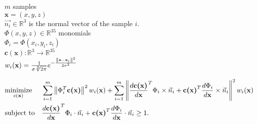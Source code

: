 $m$ samples\\
$\textbf{x}=(x,y,z)$\\
$\vec{n_i} \in \mathbb{R}^3 $ is the normal vector of the sample $i$.\\
$\Phi(x,y,z) \in \mathbb{R}^{35}$ monomials\\
$\Phi_i = \Phi(x_i,y_i,z_i)$\\
$\textbf{c}(\textbf{x}): \mathbb{R}^3 \rightarrow \mathbb{R}^{35}$\\
$w_{i}(\textbf{x}) =
\frac{1}{\sigma\sqrt[2]{2\pi}}e^{-\frac{\left\lVert\textbf{x}-\textbf{x}_i\right\rVert^2}{2\sigma^2}}$

\begin{equation*}
\begin{aligned}
& \underset{c(\textbf{x})}{\text{minimize}}
& &  \sum^m_{i=1}
\left\lVert \Phi_i^T\textbf{c(x)}\right\rVert^2w_{i}(\textbf{x})+\sum^m_{i=1}
\left\lVert\frac{d\textbf{c(x)}}{d\textbf{x}}^T\Phi_i\times
\vec{n}_i+\textbf{c(x)}^T\frac{d\Phi_i}{d\textbf{x}}\times
\vec{n}_i\right\rVert^2w_{i}(\textbf{x})\\
& \text{subject to}
& & \frac{d\textbf{c(x)}}{d\textbf{x}}^T\Phi_i\cdot
\vec{n}_i+\textbf{c(x)}^T\frac{d\Phi_i}{d\textbf{x}}\cdot
\vec{n}_i \geq 1.  
\end{aligned}
\end{equation*}